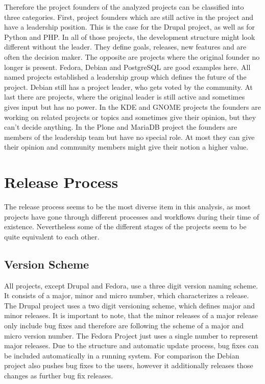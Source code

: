 Therefore the project founders of the analyzed projects can be classified into
three categories. First, project founders which are still active in the project
and have a leadership position. This is the case for the Drupal project, as
well as for Python and PHP. In all of those projects, the development structure
might look different without the leader. They define goals, releases, new
features and are often the decision maker. The opposite are projects where the
original founder no longer is present. Fedora, Debian and PostgreSQL are good
examples here. All named projects established a leadership group which defines
the future of the project. Debian still has a project leader, who gets voted by
the community. At last there are projects, where the original leader is still
active and sometimes gives input but has no power. In the KDE and GNOME
projects the founders are working on related projects or topics and sometimes
give their opinion, but they can't decide anything. In the Plone and MariaDB
project the founders are members of the leadership team but have no special
role. At most they can give their opinion and community members might give
their notion a higher value.



\section{Release Process} %

The release process seems to be the most diverse item in this analysis, as most
projects have gone through different processes and workflows during their time
of existence. Nevertheless some of the different stages of the projects seem to
be quite equivalent to each other.

\subsection{Version Scheme} %

All projects, except Drupal and Fedora, use a three digit version naming
scheme. It consists of a major, minor and micro number, which characterizes a
release. The Drupal project uses a two digit versioning scheme, which defines
major and minor releases. It is important to note, that the minor releases of a
major release only include bug fixes and therefore are following the scheme of
a major and micro version number. The Fedora Project just uses a single number
to represent major releases. Due to the structure and automatic update process,
bug fixes can be included automatically in a running system. For comparison the
Debian project also pushes bug fixes to the users, however it additionally
releases those changes as further bug fix releases.

